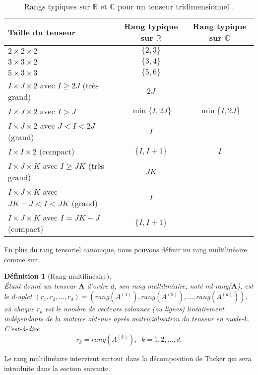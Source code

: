 \documentclass[11pt,a4paper,oneside]{book}
\newtheorem{defi}{Définition}[chapter]
\def\R{\mathbb R}
\def\C{\mathbb C}
\begin{document}
\begin{table}[htbp]
	\centering
	\caption{Rangs typiques sur $ \R $ et $ \C $ pour un tenseur tridimensionnel \cite[p.465]{Hong2008}.}
	\label{tab:minrank}
	\begin{tabular}{|l|c|c|}
		\hline
		\hline
		Taille du tenseur&Rang typique sur $ \R $&Rang typique sur $ \C $\\
		\hline
		$ 2\times 2\times 2 $&$ \{2,3\} $&\\
		\hline
		$ 3\times 3\times 2 $&$ \{3,4\} $&\\
		\hline
		$ 5\times 3\times 3 $&$ \{5,6\} $&\\
		\hline
		$ I\times J\times 2 $ avec $ I\geq 2J $ (très grand)&$ 2J$&\\
		\hline
		$ I\times J\times 2 $ avec $ I>J $ &$\min\{I,2J\} $&$\min\{I,2J\} $\\
		\hline
		$ I\times J\times 2 $ avec $ J<I<2J $ (grand)&$ I $&\\
		\hline
		$ I\times I\times 2 $ (compact)&$ \{I,I+1\} $&$ I $\\
		\hline
		$ I\times J\times K $ avec $ I\geq JK $ (très grand)&$JK $&\\
		\hline
		$ I\times J\times K $ avec $ JK-J<I<JK $ (grand)&$ I $&\\
		\hline
		$ I\times J\times K $ avec $ I=JK-J $ (compact)&$ \{I,I+1\} $&\\
		\hline
		\hline
	\end{tabular}
\end{table}

En plus du rang tensoriel canonique, nous pouvons définir un rang multilinéaire comme suit.

\begin{defi}[Rang multilinéaire]
	\emph{\\}
	Étant donné un tenseur $\mathbf{A}$ d'ordre $ d $, son rang multilinéaire, noté \textit{ml-rang}($\mathbf{A}$), est le d-uplet $(r_1,r_2,\ldots,r_d) =\left(rang(A^{(1)}),rang(A^{(2)}),\ldots, rang(A^{(d)}) \right), $ où chaque $r_k$ est le nombre de vecteurs colonnes (ou lignes) linéairement indépendants de la matrice obtenue après matricialisation du tenseur en mode-k. C'est-à-dire 	\begin{equation}
	r_k=  rang(A^{(k)}),\;\;   k = 1,2,\ldots,d.
	\end{equation} 
\end{defi}
Le rang multilinéaire intervient surtout dans la décomposition de Tucker qui sera introduite dans la section suivante.
\end{document}
